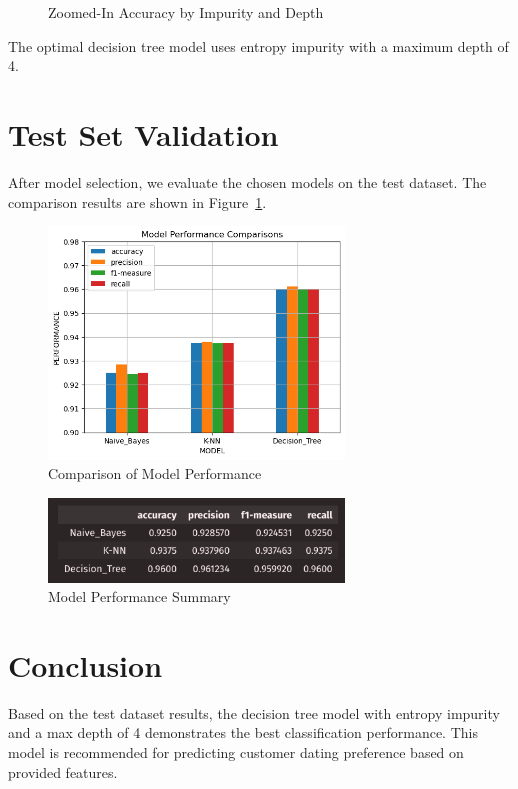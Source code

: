 \documentclass{article}
\begin{document}
\begin{figure}[H]
\begin{minipage}[b]{0.49\textwidth}
        \caption{Zoomed-In Accuracy by Impurity and Depth}
    \end{minipage}
\end{figure}

The optimal decision tree model uses entropy impurity with a maximum depth of 4.

\newpage

\section{Test Set Validation}
After model selection, we evaluate the chosen models on the test dataset. The comparison results are shown in Figure~\ref{fig:model-comparison}.

\begin{figure}[H]
    \centering
    \includegraphics[width=0.7\textwidth]{comparison.png}
    \caption{Comparison of Model Performance}
    \label{fig:model-comparison}
\end{figure}

\begin{figure}[H]
    \centering
    \includegraphics[width=0.7\textwidth]{comparison_table.png}
    \caption{Model Performance Summary}
\end{figure}

\section{Conclusion}
Based on the test dataset results, the decision tree model with entropy impurity and a max depth of 4 demonstrates the
best classification performance. This model is recommended for predicting customer dating preference based on provided
features.
\end{document}
